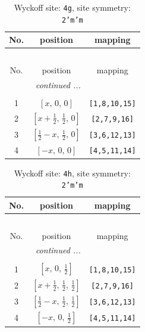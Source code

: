 \documentclass[fleqn,8pt]{jsarticle}
\begin{document}
\renewcommand{\arraystretch}{1.2}
\begin{longtable}{ccc}
\caption{Wyckoff site: {\tt 4g}, site symmetry: {\tt 2'm'm}}
 \\
 \hline \hline
No. & position & mapping \\ \hline \endfirsthead

\multicolumn{2}{l}{\tablename\ \thetable{}} \\
 \hline \hline
No. & position & mapping \\ \hline \endhead

 \hline \hline
\multicolumn{2}{r}{\footnotesize\it continued ...} \\ \endfoot

 \hline \hline
\multicolumn{2}{r}{} \\ \endlastfoot

1 & $\left[ x,\, 0,\, 0 \right]$ & {\tt [1,8,10,15]} \\ \hline
2 & $\left[ x + \frac{1}{2},\, \frac{1}{2},\, 0 \right]$ & {\tt [2,7,9,16]} \\ \hline
3 & $\left[ \frac{1}{2} - x,\, \frac{1}{2},\, 0 \right]$ & {\tt [3,6,12,13]} \\ \hline
4 & $\left[ - x,\, 0,\, 0 \right]$ & {\tt [4,5,11,14]} \\
\end{longtable}
\renewcommand{\arraystretch}{1.2}
\begin{longtable}{ccc}
\caption{Wyckoff site: {\tt 4h}, site symmetry: {\tt 2'm'm}}
 \\
 \hline \hline
No. & position & mapping \\ \hline \endfirsthead

\multicolumn{2}{l}{\tablename\ \thetable{}} \\
 \hline \hline
No. & position & mapping \\ \hline \endhead

 \hline \hline
\multicolumn{2}{r}{\footnotesize\it continued ...} \\ \endfoot

 \hline \hline
\multicolumn{2}{r}{} \\ \endlastfoot

1 & $\left[ x,\, 0,\, \frac{1}{2} \right]$ & {\tt [1,8,10,15]} \\ \hline
2 & $\left[ x + \frac{1}{2},\, \frac{1}{2},\, \frac{1}{2} \right]$ & {\tt [2,7,9,16]} \\ \hline
3 & $\left[ \frac{1}{2} - x,\, \frac{1}{2},\, \frac{1}{2} \right]$ & {\tt [3,6,12,13]} \\ \hline
4 & $\left[ - x,\, 0,\, \frac{1}{2} \right]$ & {\tt [4,5,11,14]} \\
\end{longtable}
\end{document}
